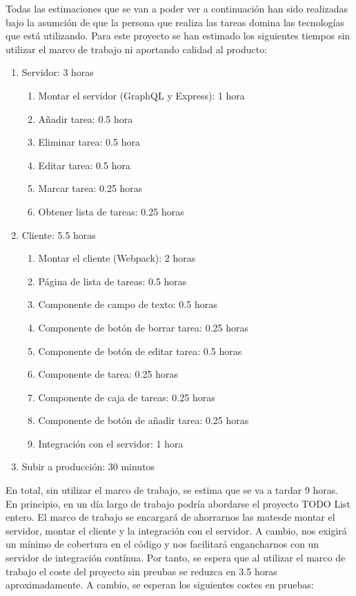 Todas las estimaciones que se van a poder ver a continuación han sido realizadas bajo la asumción de que la persona que realiza las tareas domina las tecnologías que está utilizando. Para este proyecto se han estimado los siguientes tiempos sin utilizar el marco de trabajo ni aportando calidad al producto:

\begin{enumerate}
  \item Servidor: 3 horas
    \begin{enumerate}
      \item Montar el servidor (GraphQL y Express): 1 hora
      \item Añadir tarea: 0.5 hora
      \item Eliminar tarea: 0.5 hora
      \item Editar tarea: 0.5 hora
      \item Marcar tarea: 0.25 horas
      \item Obtener lista de tareas: 0.25 horas
    \end{enumerate}
  \item Cliente: 5.5 horas
    \begin{enumerate}
      \item Montar el cliente (Webpack): 2 horas
      \item Página de lista de tareas: 0.5 horas
      \item Componente de campo de texto: 0.5 horas
      \item Componente de botón de borrar tarea: 0.25 horas
      \item Componente de botón de editar tarea: 0.5 horas
      \item Componente de tarea: 0.25 horas
      \item Componente de caja de tareas: 0.25 horas
      \item Componente de botón de añadir tarea: 0.25 horas
      \item Integración con el servidor: 1 hora
    \end{enumerate}
  \item Subir a producción: 30 minutos
\end{enumerate}

En total, sin utilizar el marco de trabajo, se estima que se va a tardar 9 horas. En principio, en un día largo de trabajo podría abordarse el proyecto TODO List entero. El marco de trabajo se encargará de ahorrarnos las matesde montar el servidor, montar el cliente y la integración con el servidor. A cambio, nos exigirá un mínimo de cobertura en el código y nos facilitará engancharnos con un servidor de integración contínua. Por tanto, se espera que al utilizar el marco de trabajo el coste del proyecto sin preubas se reduzca en 3.5 horas aproximadamente. A cambio, se esperan los siguientes costes en pruebas:

